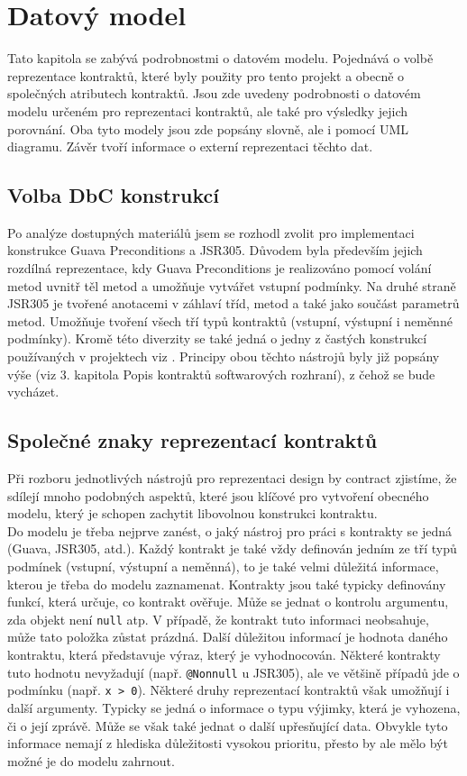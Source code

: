 \chapter{Datový model}
	Tato kapitola se zabývá podrobnostmi o datovém modelu. Pojednává o volbě reprezentace kontraktů, které byly použity pro tento projekt a obecně o společných atributech kontraktů. Jsou zde uvedeny podrobnosti o datovém modelu určeném pro reprezentaci kontraktů, ale také pro výsledky jejich porovnání. Oba tyto modely jsou zde popsány slovně, ale i pomocí UML diagramu. Závěr tvoří informace o externí reprezentaci těchto dat.


	\section{Volba DbC konstrukcí}
		Po analýze dostupných materiálů jsem se rozhodl zvolit pro implementaci konstrukce Guava Preconditions a JSR305. Důvodem byla především jejich rozdílná reprezentace, kdy Guava Preconditions je realizováno pomocí volání metod uvnitř těl metod a umožňuje vytvářet vstupní podmínky. Na druhé straně JSR305 je tvořené anotacemi v záhlaví tříd, metod a také jako součást parametrů metod. Umožňuje tvoření všech tří typů kontraktů (vstupní, výstupní i neměnné podmínky). Kromě této diverzity se také jedná o jedny z častých konstrukcí používaných v projektech viz \cite{contractsInWild}. Principy obou těchto nástrojů byly již popsány výše (viz 3. kapitola Popis kontraktů softwarových rozhraní), z čehož se bude vycházet.
				
				
	\section{Společné znaky reprezentací kontraktů}		
		Při rozboru jednotlivých nástrojů pro reprezentaci design by contract zjistíme, že sdílejí mnoho podobných aspektů, které jsou klíčové pro vytvoření obecného modelu, který je schopen zachytit libovolnou konstrukci kontraktu.\\ 
		
		Do modelu je třeba nejprve zanést, o jaký nástroj pro práci s kontrakty se jedná (Guava, JSR305, atd.). Každý kontrakt je také vždy definován jedním ze tří typů podmínek (vstupní, výstupní a neměnná), to je také velmi důležitá informace, kterou je třeba do modelu zaznamenat. Kontrakty jsou také typicky definovány funkcí, která určuje, co kontrakt ověřuje. Může se jednat o kontrolu argumentu, zda objekt není \texttt{null} atp. V případě, že kontrakt tuto informaci neobsahuje, může tato položka zůstat prázdná. Další důležitou informací je hodnota daného kontraktu, která představuje výraz, který je vyhodnocován. Některé kontrakty tuto hodnotu nevyžadují (např. \texttt{@Nonnull} u JSR305), ale ve většině případů jde o podmínku (např. \texttt{x > 0}). Některé druhy reprezentací kontraktů však umožňují i další argumenty. Typicky se jedná o informace o typu výjimky, která je vyhozena, či o její zprávě. Může se však také jednat o další upřesňující data. Obvykle tyto informace nemají z hlediska důležitosti vysokou prioritu, přesto by ale mělo být možné je do modelu zahrnout.
		
